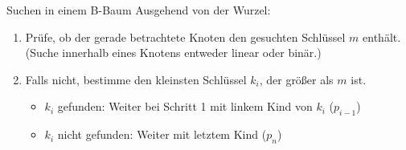 \begin{algo}{Suchen in einem B-Baum}
    Ausgehend von der Wurzel:
    \begin{enumerate}
        \item Prüfe, ob der gerade betrachtete Knoten den gesuchten Schlüssel $m$ enthält.
              \subitem (Suche innerhalb eines Knotens entweder linear oder binär.)
        \item Falls nicht, bestimme den kleinsten Schlüssel $k_i$, der größer als $m$ ist.
              \begin{itemize}
                  \item $k_i$ gefunden: Weiter bei Schritt 1 mit linkem Kind von $k_i$ ($p_{i-1}$)
                  \item $k_i$ nicht gefunden: Weiter mit letztem Kind ($p_{n}$)
              \end{itemize}
    \end{enumerate}
\end{algo}

